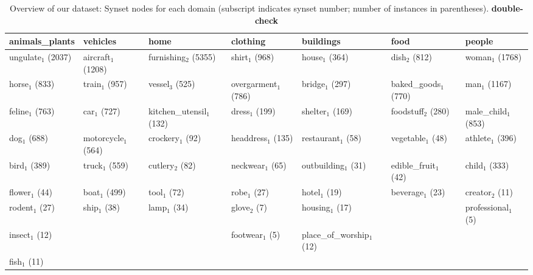 \documentclass[11pt,a4paper]{article}
\begin{document}
\begin{table}[htb]
\small
	\begin{tabular}{@{~}l@{~}l@{~}l@{~}l@{~}l@{~}l@{~}l}
	\toprule
	        animals\_plants &               vehicles &                        home &                clothing &                   buildings &                    food &                 people \\
	\midrule
	  ungulate$_1$ (2037) &  aircraft$_1$ (1208) &  furnishing$_2$ (5355) &  shirt$_1$ (968) &  house$_1$ (364) &  dish$_2$ (812) &  woman$_1$ (1768) \\
	 horse$_1$ (833) &  train$_1$ (957) &  vessel$_3$ (525) &  overgarment$_1$ (786) &  bridge$_1$ (297) &  baked\_goods$_1$ (770) &  man$_1$ (1167) \\
	  feline$_1$ (763) &  car$_1$ (727) &  kitchen\_utensil$_1$ (132) &  dress$_1$ (199) &  shelter$_1$ (169) &  foodstuff$_2$ (280) &  male\_child$_1$ (853) \\
	 dog$_1$ (688) &  motorcycle$_1$ (564) &  crockery$_1$ (92) &  headdress$_1$ (135) &  restaurant$_1$ (58) &  vegetable$_1$ (48) &  athlete$_1$ (396) \\
	  bird$_1$ (389) &  truck$_1$ (559) &  cutlery$_2$ (82) &  neckwear$_1$ (65) &  outbuilding$_1$ (31) &  edible\_fruit$_1$ (42) &  child$_1$ (333) \\
	  flower$_1$ (44) &  boat$_1$ (499) &  tool$_1$ (72) &  robe$_1$ (27) &  hotel$_1$ (19) &  beverage$_1$ (23) &  creator$_2$ (11) \\
	  rodent$_1$ (27) &  ship$_1$ (38) &  lamp$_1$ (34) &  glove$_2$ (7) &  housing$_1$ (17) &   &  professional$_1$ (5) \\
	 insect$_1$ (12) &   &   &  footwear$_1$ (5) &  place\_of\_worship$_1$ (12) &   &   \\
	  fish$_1$ (11) &   &   &   &   &   &   \\
	\bottomrule
\end{tabular}
	\caption{Overview of our dataset: Synset nodes for each domain (subscript indicates synset number; number of instances in parentheses). \textbf{double-check} \label{tab:overview_dataset2}}
      \end{table}
      
\end{document}
